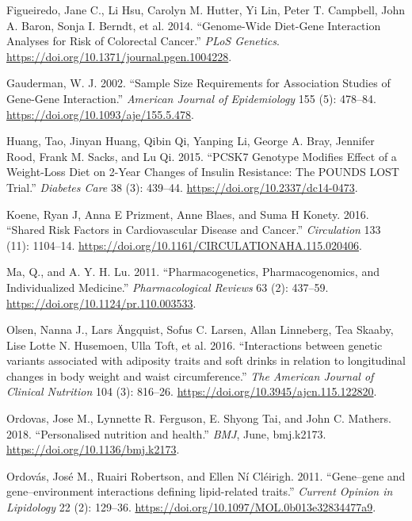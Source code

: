 \documentclass[]{article}
\begin{document}
\leavevmode\hypertarget{ref-Figueiredo2014}{}%
Figueiredo, Jane C., Li Hsu, Carolyn M. Hutter, Yi Lin, Peter T.
Campbell, John A. Baron, Sonja I. Berndt, et al. 2014. ``Genome-Wide
Diet-Gene Interaction Analyses for Risk of Colorectal Cancer.''
\emph{PLoS Genetics}.
\url{https://doi.org/10.1371/journal.pgen.1004228}.

\leavevmode\hypertarget{ref-Gauderman2002}{}%
Gauderman, W. J. 2002. ``Sample Size Requirements for Association
Studies of Gene-Gene Interaction.'' \emph{American Journal of
Epidemiology} 155 (5): 478--84.
\url{https://doi.org/10.1093/aje/155.5.478}.

\leavevmode\hypertarget{ref-Huang2015}{}%
Huang, Tao, Jinyan Huang, Qibin Qi, Yanping Li, George A. Bray, Jennifer
Rood, Frank M. Sacks, and Lu Qi. 2015. ``PCSK7 Genotype Modifies Effect
of a Weight-Loss Diet on 2-Year Changes of Insulin Resistance: The
POUNDS LOST Trial.'' \emph{Diabetes Care} 38 (3): 439--44.
\url{https://doi.org/10.2337/dc14-0473}.

\leavevmode\hypertarget{ref-Koene2016}{}%
Koene, Ryan J, Anna E Prizment, Anne Blaes, and Suma H Konety. 2016.
``Shared Risk Factors in Cardiovascular Disease and Cancer.''
\emph{Circulation} 133 (11): 1104--14.
\url{https://doi.org/10.1161/CIRCULATIONAHA.115.020406}.

\leavevmode\hypertarget{ref-Ma2011}{}%
Ma, Q., and A. Y. H. Lu. 2011. ``Pharmacogenetics, Pharmacogenomics, and
Individualized Medicine.'' \emph{Pharmacological Reviews} 63 (2):
437--59. \url{https://doi.org/10.1124/pr.110.003533}.

\leavevmode\hypertarget{ref-Olsen2016}{}%
Olsen, Nanna J., Lars Ängquist, Sofus C. Larsen, Allan Linneberg, Tea
Skaaby, Lise Lotte N. Husemoen, Ulla Toft, et al. 2016. ``Interactions
between genetic variants associated with adiposity traits and soft
drinks in relation to longitudinal changes in body weight and waist
circumference.'' \emph{The American Journal of Clinical Nutrition} 104
(3): 816--26. \url{https://doi.org/10.3945/ajcn.115.122820}.

\leavevmode\hypertarget{ref-Ordovas2018}{}%
Ordovas, Jose M., Lynnette R. Ferguson, E. Shyong Tai, and John C.
Mathers. 2018. ``Personalised nutrition and health.'' \emph{BMJ}, June,
bmj.k2173. \url{https://doi.org/10.1136/bmj.k2173}.

\leavevmode\hypertarget{ref-Ordovas2011}{}%
Ordovás, José M., Ruairi Robertson, and Ellen Ní Cléirigh. 2011.
``Gene--gene and gene--environment interactions defining lipid-related
traits.'' \emph{Current Opinion in Lipidology} 22 (2): 129--36.
\url{https://doi.org/10.1097/MOL.0b013e32834477a9}.
\end{document}
